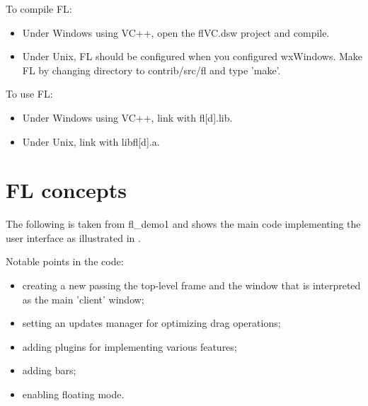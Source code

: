 To compile FL:

\begin{itemize}\itemsep=0pt
\item Under Windows using VC++, open the flVC.dsw project
and compile.
\item Under Unix, FL should be configured when you configured
wxWindows. Make FL by changing directory to contrib/src/fl and
type 'make'.
\end{itemize}

To use FL:

\begin{itemize}\itemsep=0pt
\item Under Windows using VC++, link with fl[d].lib.
\item Under Unix, link with libfl[d].a.
\end{itemize}

\section{FL concepts}

The following is taken from fl\_demo1 and shows the main code implementing the
user interface as illustrated in .

Notable points in the code:

\begin{itemize}\itemsep=0pt
\item creating a new  passing the top-level frame and the window that
is interpreted as the main 'client' window;
\item setting an updates manager for optimizing drag operations;
\item adding plugins for implementing various features;
\item adding bars;
\item enabling floating mode.
\end{itemize}


